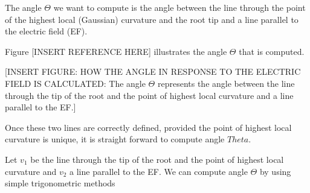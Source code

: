 The angle \( \Theta \) we want to compute is the angle between the line through the point of the highest local (Gaussian) curvature and the root tip and a line parallel to the electric field (EF).  

Figure [INSERT REFERENCE HERE] illustrates the angle \( \Theta \) that is computed. 

[INSERT FIGURE: HOW THE ANGLE IN RESPONSE TO THE ELECTRIC FIELD IS CALCULATED: The angle \( \Theta \) represents the angle between the line through the tip of the root and the point of highest local curvature and a line parallel to the EF.]


Once these two lines are correctly defined, provided the point of highest local curvature is unique, it is straight forward to compute angle \( Theta \).


%
%




Let \( v_{1} \) be the line through the tip of the root and the point of highest local curvature and \( v_{2} \) a line parallel to the EF. 
We can compute angle \( \Theta \)  by using simple trigonometric methods 

